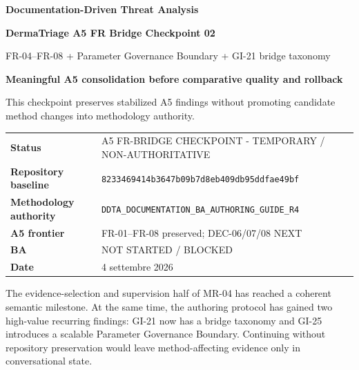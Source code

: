 \documentclass[11pt,a4paper]{article}
\begin{document}
\begin{titlepage}\thispagestyle{empty}\vspace*{8mm}
{\sffamily\bfseries\color{DDTANavy}\fontsize{15}{18}\selectfont Documentation-Driven Threat Analysis}\par\vspace{5mm}
{\sffamily\bfseries\color{DDTANavy}\fontsize{27}{31}\selectfont DermaTriage A5 FR Bridge Checkpoint 02}\par\vspace{2mm}
{\sffamily\color{DDTABlue}\fontsize{16}{20}\selectfont FR-04--FR-08 + Parameter Governance Boundary + GI-21 bridge taxonomy}\par
\vspace{9mm}
\begin{tcolorbox}[enhanced,arc=3pt,boxrule=0pt,colback=DDTANavy,left=12pt,right=12pt,top=11pt,bottom=11pt]
{\color{white}\sffamily\bfseries\large Meaningful A5 consolidation before comparative quality and rollback}\par\vspace{2mm}
{\color{white!88}\small This checkpoint preserves stabilized A5 findings without promoting candidate method changes into methodology authority.}
\end{tcolorbox}
\vspace{8mm}
\begin{tabularx}{\textwidth}{L{43mm}Y}\toprule
\textbf{Status} & A5 FR-BRIDGE CHECKPOINT - TEMPORARY / NON-AUTHORITATIVE \\
\textbf{Repository baseline} & \texttt{8233469414b3647b09b7d8eb409db95ddfae49bf} \\
\textbf{Methodology authority} & \texttt{DDTA\_DOCUMENTATION\_BA\_AUTHORING\_GUIDE\_R4} \\
\textbf{A5 frontier} & FR-01--FR-08 preserved; DEC-06/07/08 NEXT \\
\textbf{BA} & NOT STARTED / BLOCKED \\
\textbf{Date} & 4 settembre 2026 \\
\bottomrule\end{tabularx}
\vfill
\begin{ddtaprinciple}[title={Why checkpoint now}]
The evidence-selection and supervision half of MR-04 has reached a coherent semantic milestone. At the same time, the authoring protocol has gained two high-value recurring findings: GI-21 now has a bridge taxonomy and GI-25 introduces a scalable Parameter Governance Boundary. Continuing without repository preservation would leave method-affecting evidence only in conversational state.
\end{ddtaprinciple}
\end{titlepage}
\tableofcontents\clearpage
\end{document}
